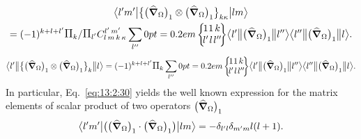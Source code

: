 \begin{multline}
\braOket{ l^{\prime} m^{\prime}}{\bigl\{\bigl(\delop_{\Omega}\bigr)_{1} \otimes\bigl(\delop_{\Omega}\bigr)_{1}\bigr\}_{k \kappa}}{l m} \\
=(-1)^{k+l+l^{\prime}} \Fact{k}/\Fact{l^\prime}
\clebsch{l}{m}{k}{\kappa}{l^{\prime}}{m^{\prime}} \sum_{l^{\prime \prime}}
\sixj{1}{1}{k}{l^{\prime}}{l}{l^{\prime \prime}}
\braOketred{ l^{\prime}}{\bigl(\delop_{\Omega}\bigr)_{1}}{ l^{\prime \prime}}
\braOketred{ l^{\prime \prime}}{\bigl(\delop_{\Omega}\bigr)_{1}}{ l} . \label{eq:13:2:30}
\end{multline}
\begin{equation*}
\braOketred{ l^{\prime}}{\bigl\{\bigl(\delop_{\Omega}\bigr)_{1} \otimes\bigl(\delop_{\Omega}\bigr)_{1}\bigr\}_{k}}{ l}=(-1)^{k+l+l^{\prime}} \Fact{k} \sum_{l^{\prime \prime}}
\sixj{1}{1}{k}{l^{\prime}}{l}{l^{\prime \prime}}
\braOketred{ l^{\prime}}{\bigl(\delop_{\Omega}\bigr)_{1}}{ l^{\prime \prime}}
\braOketred{ l^{\prime \prime}}{\bigl(\delop_{\Omega}\bigr)_{1}}{ l} .
\end{equation*}
In particular, Eq.~\eqref{eq:13:2:30} yields the well known expression for the matrix elements of scalar product of two operators \(\bigl(\widehat{\boldsymbol{\nabla}}_{\Omega}\bigr)_{1}\)
\begin{equation*}
\bigl\langle  l^{\prime} m^{\prime} \big| \bigl(\bigl(\widehat{\boldsymbol{\nabla}}_{\Omega}\bigr)_{1} \cdot\bigl(\widehat{\boldsymbol{\nabla}}_{\Omega}\bigr)_{1}\bigr) \big| l m \bigr\rangle=-\delta_{l^{\prime} l} \delta_{m^{\prime} m} l(l+1).
\end{equation*}

